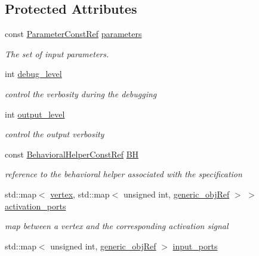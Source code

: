 \subsection*{Protected Attributes}
\begin{DoxyCompactItemize}
\item 
const \hyperlink{Parameter_8hpp_a37841774a6fcb479b597fdf8955eb4ea}{Parameter\+Const\+Ref} \hyperlink{classconn__binding_a2fea3ae9e3d6941856636531c50c6ff6}{parameters}
\begin{DoxyCompactList}\small\item\em The set of input parameters. \end{DoxyCompactList}\item 
int \hyperlink{classconn__binding_af0b05f77221d5cd5eff651b767d039d7}{debug\+\_\+level}
\begin{DoxyCompactList}\small\item\em control the verbosity during the debugging \end{DoxyCompactList}\item 
int \hyperlink{classconn__binding_a60cfb5c986070b396f335e790e99a034}{output\+\_\+level}
\begin{DoxyCompactList}\small\item\em control the output verbosity \end{DoxyCompactList}\item 
const \hyperlink{behavioral__helper_8hpp_aae973b54cac87eef3b27442aa3e1e425}{Behavioral\+Helper\+Const\+Ref} \hyperlink{classconn__binding_a10ef50de9953e2267264484077bdbfdb}{BH}
\begin{DoxyCompactList}\small\item\em reference to the behavioral helper associated with the specification \end{DoxyCompactList}\item 
std\+::map$<$ \hyperlink{graph_8hpp_abefdcf0544e601805af44eca032cca14}{vertex}, std\+::map$<$ unsigned int, \hyperlink{generic__obj_8hpp_acb533b2ef8e0fe72e09a04d20904ca81}{generic\+\_\+obj\+Ref} $>$ $>$ \hyperlink{classconn__binding_ac0b9f48b56e603ba299ae97f439247a7}{activation\+\_\+ports}
\begin{DoxyCompactList}\small\item\em map between a vertex and the corresponding activation signal \end{DoxyCompactList}\item 
std\+::map$<$ unsigned int, \hyperlink{generic__obj_8hpp_acb533b2ef8e0fe72e09a04d20904ca81}{generic\+\_\+obj\+Ref} $>$ \hyperlink{classconn__binding_a829b8672c7f9b2d48e0583cf39e1e768}{input\+\_\+ports}

\end{DoxyCompactItemize}
